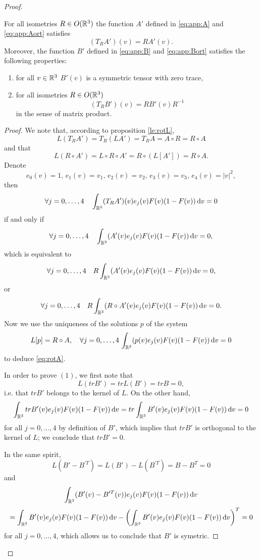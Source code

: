 \begin{subappendices}
\begin{proof}
\begin{proposition}\label{le:rotA}
	For all isometries $R\in O({\mathbb {R}^3})$ the function $A'$ defined in \eqref{eq:app:A} and \eqref{eq:app:Aort} %
satisfies
\begin{equation}\label{eq:rotA}
	(T_RA')(v)=RA'(v).
\end{equation}
Moreover, the function $B'$ defined in \eqref{eq:app:B} and \eqref{eq:app:Bort} %
satisfies the following properties:
\begin{enumerate}
\item for all $v\in {\mathbb {R}^3}$ $B'(v)$ is a symmetric tensor with zero trace,
\item for all isometries $R\in O({\mathbb {R}^3})$
\begin{equation}\label{eq:rotB}
	(T_RB')(v)=RB'(v)R^{-1}
\end{equation}
in the sense of matrix product.
\end{enumerate}
\end{proposition}
\begin{proof}
We note that, according to proposition \ref{le:rotL},
\begin{equation*}
	L(T_RA')=T_R(LA')=T_RA=A\circ R = R\circ A
\end{equation*}
and that
\[L(R\circ A') = L\circ R\circ A'= R\circ (L[A'])=R\circ A.\]
Denote \[e_0(v)=1,\,e_1(v)=v_1,\, e_2(v)=v_2,\, e_3(v)=v_3,\,  e_4(v)=|v|^2,\]
then
\[\forall j=0,\ldots,4\quad\int_{{\mathbb {R}^3}}(T_RA')(v)e_j(v) F(v)(1-F(v)) {\,\mathrm{d} v}=0 \]
if and only if 
\[\forall j=0,\ldots,4\quad\int_{{\mathbb {R}^3}}(A'(v)e_j(v) F(v)(1-F(v)) {\,\mathrm{d} v}=0, \]
which is equivalent to
\[\forall j=0,\ldots,4\quad R\int_{{\mathbb {R}^3}}(A'(v)e_j(v) F(v)(1-F(v)) {\,\mathrm{d} v}=0, \]
or
\[\forall j=0,\ldots,4\quad R\int_{{\mathbb {R}^3}}(R\circ A'(v)e_j(v) F(v)(1-F(v)) {\,\mathrm{d} v}=0. \]
Now we use the uniqueness of the solutions $p$ of the system
\[L[p]=R\circ A,\quad \forall j=0,\ldots,4\,\int_{{\mathbb {R}^3}}(p(v)e_j(v) F(v)(1-F(v)) {\,\mathrm{d} v}=0\]
to deduce \eqref{eq:rotA}.

In order to prove $(1)$, we first note that
\[L(tr B') = tr L(B')=tr B=0,\]i.e. that $tr B'$ belongs to the kernel of $L$.
On the other hand,
\[\int_{\mathbb {R}^3} tr B'(v)e_j(v)F(v)(1-F(v)){\,\mathrm{d} v}=tr\int_{\mathbb {R}^3}   B'(v)e_j(v)F(v)(1-F(v)){\,\mathrm{d} v}=0\]
for all $j=0,\ldots,4$ by definition of $B'$, which implies that $tr B'$ is orthogonal to the kernel of $L$; we conclude that $tr B'=0$.

In the same spirit,
\[L(B'-B^{\prime T})=L(B')-L(B^{\prime T})=B-B^T=0\]
and
\[ \int_{\mathbb {R}^3} (B'(v)-B^{\prime T}(v))e_j(v)F(v)(1-F(v)){\,\mathrm{d} v}\]\[=\int_{\mathbb {R}^3}   B'(v)e_j(v)F(v)(1-F(v)){\,\mathrm{d} v}-\left(\int_{\mathbb {R}^3}   B'(v)e_j(v)F(v)(1-F(v)){\,\mathrm{d} v}\right)^T=0 \]for all $j=0,\ldots,4$,
which allows us to conclude that $B'$ is symetric.


\end{proof}
\end{proof}
\end{subappendices}
